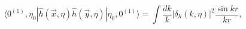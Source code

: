 \begin{equation}
\langle 0^{(1)},\eta_0| \hat{h}(\vec{x},\eta) \hat{h}(\vec{y},\eta) |\eta_{0}, 0^{(1)}\rangle 
= \int \frac{d k}{k} |\delta_{h}(k,\eta)|^2 
\frac{\sin{k r} }{k r},
\label{ps1}
\end{equation}

